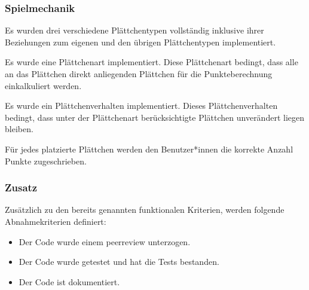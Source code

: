 \documentclass[../main.tex]{subfiles}
\begin{document}
	\subsubsection{Spielmechanik}
	\par Es wurden drei verschiedene Plättchentypen vollständig inklusive ihrer Beziehungen zum eigenen und den übrigen Plättchentypen  implementiert.
	\par Es wurde eine Plättchenart implementiert. Diese Plättchenart bedingt, dass alle an das Plättchen direkt anliegenden Plättchen für die Punkteberechnung einkalkuliert werden.
	\par Es wurde ein Plättchenverhalten implementiert. Dieses Plättchenverhalten bedingt, dass unter der Plättchenart berücksichtigte Plättchen unverändert liegen bleiben.
	\par Für jedes platzierte Plättchen werden den Benutzer*innen die korrekte Anzahl Punkte zugeschrieben.
	
	\subsubsection{Zusatz}
	\par Zusätzlich zu den bereits genannten funktionalen Kriterien, werden folgende Abnahmekriterien definiert:
	\begin{itemize}
		\item Der Code wurde einem \gls{peerreview} unterzogen.
		\item Der Code wurde getestet und hat die Tests bestanden.
		\item Der Code ist dokumentiert.
	\end{itemize}
\end{document}
